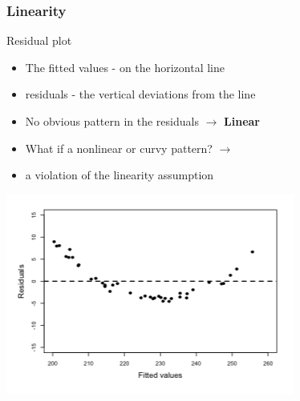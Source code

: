 \documentclass[10p]{beamer}\usepackage[]{graphicx}\usepackage[]{color}
\begin{document}
\begin{frame}
\frametitle{Linearity}
Residual plot
\begin{itemize}
\item The fitted values - on the horizontal line
\item residuals - the vertical deviations from the line
\item \alert{No obvious pattern} in the residuals $\rightarrow$ \textbf{Linear}
\pause
\item What if a nonlinear or curvy pattern? $\rightarrow$
\item a violation of the linearity assumption
\end{itemize}
\begin{center}
\includegraphics[scale=.4]{figure/fig1}
\end{center}
\end{frame}
\end{document}
